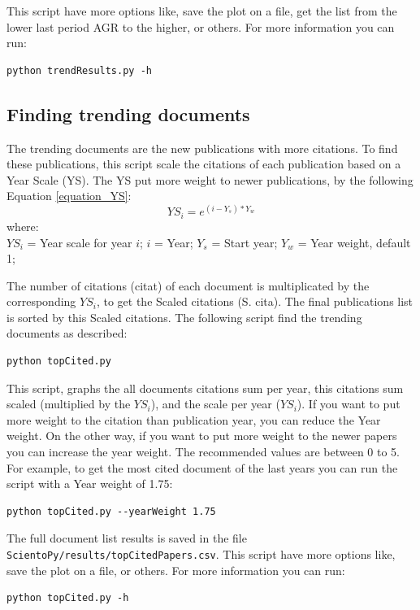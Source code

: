 \documentclass[10pt,letterpaper]{article}
\begin{document}
This script have more options like, save the plot on a file, get the list from the lower last period AGR to the higher, or others. For more information you can run:

\begin{verbatim}
python trendResults.py -h
\end{verbatim}


\subsection{Finding trending documents}

The trending documents are the new publications with more citations. To find these publications, this script scale the citations of each publication based on a Year Scale (YS). The YS put more weight to newer publications, by the following Equation \eqref{equation_YS}:
\begin{equation}
YS_i = e^{(i - Y_s)*Y_w}
\label{equation_YS}
\end{equation}
where:\\
$YS_i$ = Year scale for year $i$;
$i$ = Year;
$Y_s$ = Start year;
$Y_w$ = Year weight, default 1;
\newline

The number of citations (citat) of each document is multiplicated by the corresponding $YS_i$, to get the Scaled citations (S. cita). The final publications list is sorted by this Scaled citations. The following script find the trending documents as described:

\begin{verbatim}
python topCited.py
\end{verbatim}

This script, graphs the all documents citations sum per year, this citations sum scaled (multiplied by the $YS_i$), and the scale per year ($YS_i$). If you want to put more weight to the citation than publication year, you can reduce the Year weight. On the other way, if you want to put more weight to the newer papers you can increase the year weight. The recommended values are between 0 to 5. For example, to get the most cited document of the last years you can run the script with a Year weight of 1.75:

\begin{verbatim}
python topCited.py --yearWeight 1.75
\end{verbatim}


The full document list results is saved in the file \verb|ScientoPy/results/topCitedPapers.csv|. This script have more options like, save the plot on a file, or others. For more information you can run:

\begin{verbatim}
python topCited.py -h
\end{verbatim}
\end{document}
